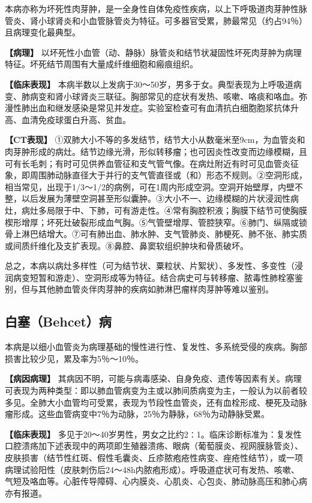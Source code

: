 本病亦称为坏死性肉芽肿，是一全身性自体免疫性疾病，以上下呼吸道肉芽肿性脉管炎、肾小球肾炎和小血管脉管炎为特征。可多器官受累，肺最常见（约占94％）且病理变化最典型。

\textbf{【病理】}
以坏死性小血管（动、静脉）脉管炎和结节状凝固性坏死肉芽肿为病理特征。坏死结节周围有大量成纤维细胞和瘢痕组织。

\textbf{【临床表现】}
本病半数以上发病于30～50岁，男多于女。典型表现为上呼吸道病变、肺病变和肾小球肾炎三联征。胸部常见的症状有发热、咳嗽、咯痰和咯血。弥漫性肺出血和继发感染是常见并发症。实验室检查可有血清抗白细胞胞浆抗体升高、血清免疫球蛋白升高、贫血。

\textbf{【CT表现】}
①双肺大小不等的多发结节，结节大小从数毫米至9cm，为血管炎和肉芽肿形成的病灶。结节边缘光滑，形似转移瘤；也可因炎性改变而边缘模糊，且可有长毛刺；有时可见供养血管征和支气管气像。在病灶附近有时可见血管炎征象，即周围肺动脉直径大于并行的支气管直径或（和）形态不规则。②空洞形成，相当常见，出现于1/3～1/2的病例，可在1周内形成空洞。空洞开始壁厚，内壁不整，以后发展为薄壁空洞甚至形似囊肿。③大小不一、边缘模糊的片状浸润性病灶，病灶多局限于中、下肺，可有游走性。④常有胸腔积液；胸膜下结节可使胸膜楔形增厚；坏死灶破裂形成血气胸。⑤气管壁增厚、管腔狭窄。⑥肺门、纵隔或锁骨上淋巴结增大。⑦可有肺出血、肺水肿、支气管肺炎、肺梗死、肺不张、肺实质或间质纤维化及支扩表现。⑧鼻腔、鼻窦软组织肿块和骨质破坏。

总之，本病以病灶多样性（可为结节状、粟粒状、片絮状）、多发性、多变性（浸润病变短暂和游走）、空洞形成等为特征。结合病史可与转移瘤、脓毒性肺栓塞鉴别，但与其他肺血管炎伴肉芽肿的疾病如肺淋巴瘤样肉芽肿等难以鉴别。

\subsection{白塞（Behcet）病}

本病是以细小血管炎为病理基础的慢性进行性、复发性、多系统受侵的疾病。胸部损害比较少见，累及率为5％～10％。

\textbf{【病因病理】}
其病因不明，可能与病毒感染、自身免疫、遗传等因素有关。病理可表现为两种类型：即以肺血管病变为主或以肺间质病变为主，一般认为以前者较多见。全肺大小血管均可受累，表现为节段性血管炎，还有血栓形成、梗死及动脉瘤形成。这些血管病变中7％为动脉，25％为静脉，68％为动静脉受累。

\textbf{【临床表现】}
多见于20～40岁男性，男女之比约2∶1。临床诊断标准为：复发性口腔溃疡加下述表现中的两项即生殖器溃疡、眼病（葡萄膜炎、视网膜脉管炎）、皮肤损害（结节性红斑、假性毛囊炎、丘疹脓疱疮性病变、痤疮性结节），或一项病理试验阳性（皮肤刺伤后24～48h内脓疱形成）。呼吸道症状可有发热、咳嗽、气短及咯血等。心脏传导障碍、心内膜炎、心肌炎、心包炎、肺动脉高压和肺心病亦有报道。

